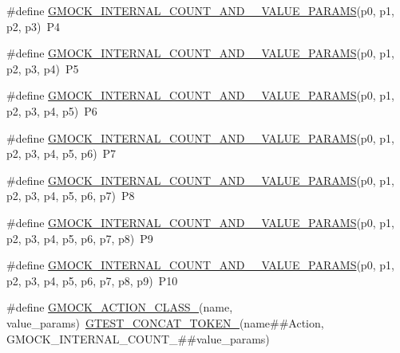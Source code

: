 \begin{DoxyCompactItemize}
\item 
\#define \mbox{\hyperlink{googletest-master_2googlemock_2include_2gmock_2gmock-generated-actions_8h_aeb588496af9fc2b8e3c4702dac7e966e}{G\+M\+O\+C\+K\+\_\+\+I\+N\+T\+E\+R\+N\+A\+L\+\_\+\+C\+O\+U\+N\+T\+\_\+\+A\+N\+D\+\_\+\_\+\+V\+A\+L\+U\+E\+\_\+\+P\+A\+R\+A\+MS}}(p0,  p1,  p2,  p3)~P4
\item 
\#define \mbox{\hyperlink{googletest-master_2googlemock_2include_2gmock_2gmock-generated-actions_8h_a29d90b8cedec75d4acbf2df27ef0e3b5}{G\+M\+O\+C\+K\+\_\+\+I\+N\+T\+E\+R\+N\+A\+L\+\_\+\+C\+O\+U\+N\+T\+\_\+\+A\+N\+D\+\_\+\_\+\+V\+A\+L\+U\+E\+\_\+\+P\+A\+R\+A\+MS}}(p0,  p1,  p2,  p3,  p4)~P5
\item 
\#define \mbox{\hyperlink{googletest-master_2googlemock_2include_2gmock_2gmock-generated-actions_8h_ab79feaedfcef7df29e87695b82e9b65d}{G\+M\+O\+C\+K\+\_\+\+I\+N\+T\+E\+R\+N\+A\+L\+\_\+\+C\+O\+U\+N\+T\+\_\+\+A\+N\+D\+\_\+\_\+\+V\+A\+L\+U\+E\+\_\+\+P\+A\+R\+A\+MS}}(p0,  p1,  p2,  p3,  p4,  p5)~P6
\item 
\#define \mbox{\hyperlink{googletest-master_2googlemock_2include_2gmock_2gmock-generated-actions_8h_ab4b49f0cdb482c0d7a6249607ac44f24}{G\+M\+O\+C\+K\+\_\+\+I\+N\+T\+E\+R\+N\+A\+L\+\_\+\+C\+O\+U\+N\+T\+\_\+\+A\+N\+D\+\_\+\_\+\+V\+A\+L\+U\+E\+\_\+\+P\+A\+R\+A\+MS}}(p0,  p1,  p2,  p3,  p4,  p5,  p6)~P7
\item 
\#define \mbox{\hyperlink{googletest-master_2googlemock_2include_2gmock_2gmock-generated-actions_8h_a461b026c9cc310c199ab1f0b59111e5a}{G\+M\+O\+C\+K\+\_\+\+I\+N\+T\+E\+R\+N\+A\+L\+\_\+\+C\+O\+U\+N\+T\+\_\+\+A\+N\+D\+\_\+\_\+\+V\+A\+L\+U\+E\+\_\+\+P\+A\+R\+A\+MS}}(p0,  p1,  p2,  p3,  p4,  p5,  p6,  p7)~P8
\item 
\#define \mbox{\hyperlink{googletest-master_2googlemock_2include_2gmock_2gmock-generated-actions_8h_a425b81bf1cdf7cd14d1e0184df9f204f}{G\+M\+O\+C\+K\+\_\+\+I\+N\+T\+E\+R\+N\+A\+L\+\_\+\+C\+O\+U\+N\+T\+\_\+\+A\+N\+D\+\_\+\_\+\+V\+A\+L\+U\+E\+\_\+\+P\+A\+R\+A\+MS}}(p0,  p1,  p2,  p3,  p4,  p5,  p6,  p7,  p8)~P9
\item 
\#define \mbox{\hyperlink{googletest-master_2googlemock_2include_2gmock_2gmock-generated-actions_8h_abfe1adfe26341b5270a8d3385035c464}{G\+M\+O\+C\+K\+\_\+\+I\+N\+T\+E\+R\+N\+A\+L\+\_\+\+C\+O\+U\+N\+T\+\_\+\+A\+N\+D\+\_\+\_\+\+V\+A\+L\+U\+E\+\_\+\+P\+A\+R\+A\+MS}}(p0,  p1,  p2,  p3,  p4,  p5,  p6,  p7,  p8,  p9)~P10
\item 
\#define \mbox{\hyperlink{googletest-master_2googlemock_2include_2gmock_2gmock-generated-actions_8h_af1442d2b3f80b5d04b409bca938fdcc5}{G\+M\+O\+C\+K\+\_\+\+A\+C\+T\+I\+O\+N\+\_\+\+C\+L\+A\+S\+S\+\_\+}}(name,  value\+\_\+params)~\mbox{\hyperlink{_obj__test_2lib_2googletest-release-1_88_81_2googletest_2include_2gtest_2internal_2gtest-internal_8h_ae3c336cbe1ae2bd1b1d019333e4428a0}{G\+T\+E\+S\+T\+\_\+\+C\+O\+N\+C\+A\+T\+\_\+\+T\+O\+K\+E\+N\+\_\+}}(name\#\#Action, G\+M\+O\+C\+K\+\_\+\+I\+N\+T\+E\+R\+N\+A\+L\+\_\+\+C\+O\+U\+N\+T\+\_\+\#\#value\+\_\+params)

\end{DoxyCompactItemize}
